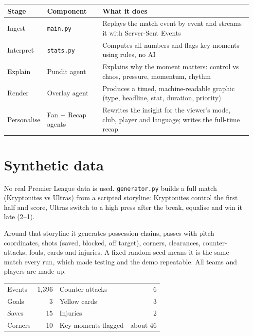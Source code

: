 \documentclass[11pt,a4paper]{article}
\newcommand{\code}[1]{\texttt{#1}}
\begin{document}
\begin{tabularx}{\textwidth}{@{}llX@{}}
\toprule
\textbf{Stage} & \textbf{Component} & \textbf{What it does} \\
\midrule
Ingest      & \code{main.py}       & Replays the match event by event and streams it with Server-Sent Events \\
Interpret   & \code{stats.py}      & Computes all numbers and flags key moments using rules, no AI \\
Explain     & Pundit agent         & Explains why the moment matters: control vs chaos, pressure, momentum, rhythm \\
Render      & Overlay agent        & Produces a timed, machine-readable graphic (type, headline, stat, duration, priority) \\
Personalise & Fan + Recap agents   & Rewrites the insight for the viewer's mode, club, player and language; writes the full-time recap \\
\bottomrule
\end{tabularx}

\section{Synthetic data}

No real Premier League data is used. \code{generator.py} builds a full match (Kryptonites vs Ultras) from a scripted storyline: Kryptonites control the first half and score, Ultras switch to a high press after the break, equalise and win it late (2--1).

Around that storyline it generates possession chains, passes with pitch coordinates, shots (saved, blocked, off target), corners, clearances, counter-attacks, fouls, cards and injuries. A fixed random seed means it is the same match every run, which made testing and the demo repeatable. All teams and players are made up.

\begin{center}
\begin{tabular}{@{}lr@{\hspace{2.5cm}}lr@{}}
\toprule
Events          & 1,396 & Counter-attacks      & 6 \\
Goals           & 3     & Yellow cards         & 3 \\
Saves           & 15    & Injuries             & 2 \\
Corners         & 10    & Key moments flagged  & about 46 \\
\bottomrule
\end{tabular}
\end{center}
\end{document}
